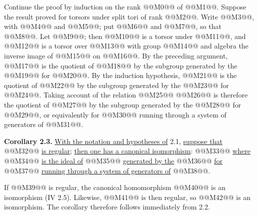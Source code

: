 
Continue the proof by induction on the rank @@M0@@ of @@M1@@. Suppose the result proved for torsors under split tori of rank @@M2@@. Write @@M3@@, with @@M4@@ and @@M5@@; put @@M6@@ and @@M7@@, so that @@M8@@. Let @@M9@@; then @@M10@@ is a torsor under @@M11@@, and @@M12@@ is a torsor over @@M13@@ with group @@M14@@ and algebra the inverse image of @@M15@@ on @@M16@@. By the preceding argument, @@M17@@ is the quotient of @@M18@@ by the subgroup generated by the @@M19@@ for @@M20@@. By the induction hypothesis, @@M21@@ is the quotient of @@M22@@ by the subgroup generated by the @@M23@@ for @@M24@@. Taking account of the relation
@@M25@@
@@M26@@ is therefore the quotient of @@M27@@ by the subgroup generated by the @@M28@@ for @@M29@@, or equivalently for @@M30@@ running through a system of generators of @@M31@@.

\textbf{Corollary 2.3.} \uline{With the notation and hypotheses of} 2.1, \uline{suppose that} @@M32@@ \uline{is regular}; \uline{then one has a canonical isomorphism}:
@@M33@@
\uline{where} @@M34@@ \uline{is the ideal of} @@M35@@ \uline{generated by the} @@M36@@ \uline{for} @@M37@@ \uline{running through a system of generators of} @@M38@@.

If @@M39@@ is regular, the canonical homomorphism @@M40@@ is an isomorphism (IV 2.5). Likewise, @@M41@@ is then regular, so @@M42@@ is an isomorphism. The corollary therefore follows immediately from 2.2.

